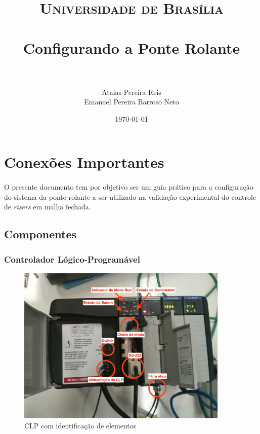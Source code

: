 \documentclass[a4paper,11pt]{scrartcl} %
\title{	
\normalfont \normalsize 
\textsc{Universidade de Brasília} \\ [25pt] %
\horrule{0.5pt} \\[0.4cm] %
\huge Configurando a Ponte Rolante \\ %
\horrule{2pt} \\[0.5cm] %
}
\author{Ataias Pereira Reis \\ Emanuel Pereira Barroso Neto} %
\date{\normalsize\today} %
\numberwithin{equation}{section} %
\numberwithin{figure}{section} %
\numberwithin{table}{section} %
\begin{document}
\maketitle %


\section{Conexões Importantes}
\paragraph{} O presente documento tem por objetivo ser um guia prático para a configuração do sistema da ponte rolante a ser utilizado na validação experimental do controle de \textit{risers} em malha fechada.


\subsection{Componentes}


\subsubsection{Controlador Lógico-Programável}
\begin{figure}[!ht]
  \centering
    \includegraphics[width=0.9\textwidth]{figures/hardware/CLP.jpg}
    \caption{CLP com identificação de elementos\label{CLPcomentado}}
\end{figure}
\end{document}
